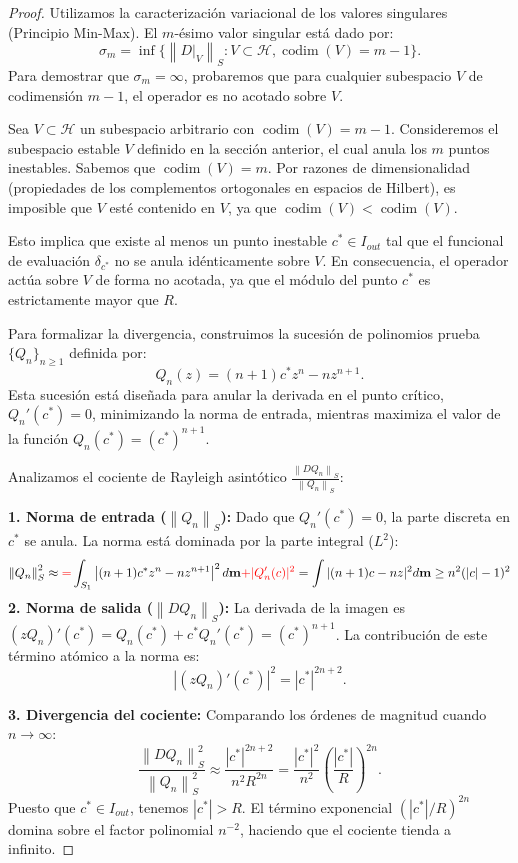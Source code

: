 \documentclass[12pt,a4paper]{article}
\theoremstyle{definition}
\theoremstyle{remark}
\newcommand{\norm}[1]{\left\| #1 \right\|_S}
\newcommand{\abs}[1]{\left| #1 \right|}
\begin{document}
\begin{proof}
    Utilizamos la caracterización variacional de los valores singulares (Principio Min-Max). El $m$-ésimo valor singular está dado por:
    $$ \sigma_m = \inf \{ \norm{D|_V} : V \subset \mathcal{H}, \operatorname{codim}(V) = m-1 \}. $$
    Para demostrar que $\sigma_m = \infty$, probaremos que para cualquier subespacio $V$ de codimensión $m-1$, el operador es no acotado sobre $V$.

    Sea $V \subset \mathcal{H}$ un subespacio arbitrario con $\operatorname{codim}(V) = m-1$.
    Consideremos el subespacio estable $V$ definido en la sección anterior, el cual anula los $m$ puntos inestables. Sabemos que $\operatorname{codim}(V) = m$. Por razones de dimensionalidad (propiedades de los complementos ortogonales en espacios de Hilbert), es imposible que $V$ esté contenido en $V$, ya que $\operatorname{codim}(V) < \operatorname{codim}(V)$.

    Esto implica que existe al menos un punto inestable $c^* \in I_{out}$ tal que el funcional de evaluación $\delta_{c^*}$ no se anula idénticamente sobre $V$. En consecuencia, el operador actúa sobre $V$ de forma no acotada, ya que el módulo del punto $c^*$ es estrictamente mayor que $R$.

    Para formalizar la divergencia, construimos la sucesión de polinomios prueba $\{Q_n\}_{n \geq 1}$ definida por:
    $$ Q_n(z) = (n+1)c^* z^n - n z^{n+1}. $$
    Esta sucesión está diseñada para anular la derivada en el punto crítico, $Q_n'(c^*) = 0$, minimizando la norma de entrada, mientras maximiza el valor de la función $Q_n(c^*) = (c^*)^{n+1}$.

    Analizamos el cociente de Rayleigh asintótico $\frac{\norm{DQ_n}}{\norm{Q_n}}$:

    \textbf{1. Norma de entrada ($\norm{Q_n}$):}
    Dado que $Q_n'(c^*) = 0$, la parte discreta en $c^*$ se anula. La norma está dominada por la parte integral ($L^2$):
    $$ \norm{Q_n}^2 \approx \textcolor{red}{=}\int_{S_1} \abs{(n+1)c^* z^n - n z^{n+1}}^2 d{\bf m
    }  \textcolor{red}{+ \vert Q'_n(c)\vert^2}=
    \int \vert (n+1)c-nz\vert^2d{\bf m
    } \geq n^2(\vert c \vert -1)^2  $$
    \textbf{2. Norma de salida ($\norm{DQ_n}$):}
    La derivada de la imagen es $(zQ_n)'(c^*) = Q_n(c^*) + c^* Q_n'(c^*) = (c^*)^{n+1}$.
    La contribución de este término atómico a la norma es:
    $$ \abs{(zQ_n)'(c^*)}^2 = \abs{c^*}^{2n+2}. $$

    \textbf{3. Divergencia del cociente:}
    Comparando los órdenes de magnitud cuando $n \to \infty$:
    $$ \frac{\norm{DQ_n}^2}{\norm{Q_n}^2} \approx \frac{\abs{c^*}^{2n+2}}{n^2 R^{2n}} = \frac{\abs{c^*}^2}{n^2} \left( \frac{\abs{c^*}}{R} \right)^{2n}. $$
    Puesto que $c^* \in I_{out}$, tenemos $\abs{c^*} > R$. El término exponencial $(\abs{c^*}/R)^{2n}$ domina sobre el factor polinomial $n^{-2}$, haciendo que el cociente tienda a infinito.


\end{proof}
\end{document}
